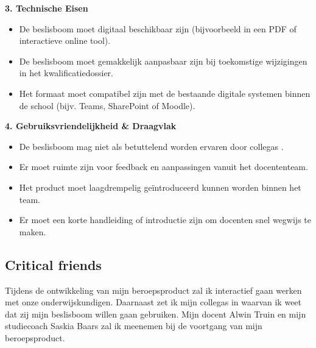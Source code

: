 \textbf{3. Technische Eisen}
\begin{itemize}
    \item De beslisboom moet digitaal beschikbaar zijn (bijvoorbeeld in een PDF of interactieve online tool).
    \item De beslisboom moet gemakkelijk aanpasbaar zijn bij toekomstige wijzigingen in het kwalificatiedossier.
    \item Het formaat moet compatibel zijn met de bestaande digitale systemen binnen de school (bijv. Teams, SharePoint of Moodle).
\end{itemize}

\textbf{4. Gebruiksvriendelijkheid \& Draagvlak}
\begin{itemize}
    \item De beslisboom mag niet als betuttelend worden ervaren door collega\textquotesingle s
    .
    \item Er moet ruimte zijn voor feedback en aanpassingen vanuit het docententeam.
    \item Het product moet laagdrempelig geïntroduceerd kunnen worden binnen het team.
    \item Er moet een korte handleiding of introductie zijn om docenten snel wegwijs te maken.
\end{itemize}

\subsection{Critical friends}
Tijdens de ontwikkeling van mijn beroepsproduct zal ik interactief gaan werken met onze onderwijskundigen. Daarnaast zet ik mijn collega\textquotesingle s
 in waarvan ik weet dat zij mijn beslisboom willen gaan gebruiken. Mijn docent Alwin Truin en mijn studiecoach Saskia Baars zal ik meenemen bij de voortgang van mijn beroepsproduct. 

